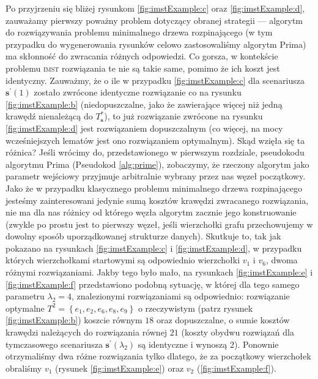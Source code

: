 Po przyjrzeniu się bliżej rysunkom \ref{fig:imstExample:c} oraz \ref{fig:imstExample:d}, zauważamy pierwszy poważny problem dotyczący obranej strategii --- algorytm do rozwiązywania problemu minimalnego drzewa rozpinającego (w tym przypadku do wygenerowania rysunków celowo zastosowaliśmy algorytm Prima) ma skłonność do zwracania różnych odpowiedzi. Co gorsza, w kontekście problemu \textsc{imst} rozwiązania te nie są takie same, pomimo że ich koszt jest identyczny. Zauważmy, że o ile w przypadku \ref{fig:imstExample:c} dla scenariusza $\textbf{s}^{\prime} \left( 1 \right)$ zostało zwrócone identyczne rozwiązanie co na rysunku \ref{fig:imstExample:b} (niedopuszczalne, jako że zawierające więcej niż jedną krawędź nienależącą do $T^{\ast}_{\textbf{s}}$), to już rozwiązanie zwrócone na rysunku \ref{fig:imstExample:d} jest rozwiązaniem dopuszczalnym (co więcej, na mocy wcześniejszych lematów jest ono rozwiązaniem optymalnym). Skąd wzięła się ta różnica? Jeśli wrócimy do, przedstawionego w pierwszym rozdziale, pseudokodu algorytmu Prima (Pseudokod \ref{alg:prime}), zobaczymy, że rzeczony algorytm jako parametr wejściowy przyjmuje arbitralnie wybrany przez nas węzeł początkowy. Jako że w przypadku klasycznego problemu minimalnego drzewa rozpinającego jesteśmy zainteresowani jedynie sumą kosztów krawędzi zwracanego rozwiązania, nie ma dla nas różnicy od którego węzła algorytm zacznie jego konstruowanie (zwykle po prostu jest to pierwszy węzeł, jeśli wierzchołki grafu przechowujemy w dowolny sposób uporządkowanej strukturze danych). Skutkuje to, tak jak pokazano na rysunkach \ref{fig:imstExample:c} i \ref{fig:imstExample:d}, w przypadku których wierzchołkami startowymi są odpowiednio wierzchołki $v_{1}$ i $v_{6}$, dwoma różnymi rozwiązaniami. Jakby tego było mało, na rysunkach \ref{fig:imstExample:e} i \ref{fig:imstExample:f} przedstawiono podobną sytuację, w której dla tego samego parametru $\lambda_{2} = 4$, znalezionymi rozwiązaniami są odpowiednio: rozwiązanie optymalne $T^{2} = \left\{ e_{1}, e_{2}, e_{6}, e_{8}, e_{9} \right\}$ o rzeczywistym (patrz rysunek \ref{fig:imstExample:b}) koszcie równym $18$ oraz dopuszczalne, o sumie kosztów krawędzi należących do rozwiązania równej $21$ (koszty obydwu rozwiązań dla tymczasowego scenariusza $\textbf{s}^{\prime} \left( \lambda_{2} \right)$ są identyczne i wynoszą $2$). Ponownie otrzymaliśmy dwa różne rozwiązania tylko dlatego, że za początkowy wierzchołek obraliśmy $v_{1}$ (rysunek \ref{fig:imstExample:e}) oraz $v_{2}$ (\ref{fig:imstExample:f}).

